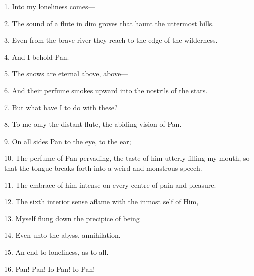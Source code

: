 
1. Into my loneliness comes---

2. The sound of a flute in dim groves that haunt the uttermost hills.

3. Even from the brave river they reach to the edge of the wilderness.

4. And I behold Pan.

5. The snows are eternal above, above---

6. And their perfume smokes upward into the nostrils of the stars.

7. But what have I to do with these?

8. To me only the distant flute, the abiding vision of Pan.

9. On all sides Pan to the eye, to the ear;

10. The perfume of Pan pervading, the taste of him utterly filling my mouth, so that the tongue breaks forth into a weird and monstrous speech.

11. The embrace of him intense on every centre of pain and pleasure.

12. The sixth interior sense aflame with the inmost self of Him,

13. Myself flung down the precipice of being

14. Even unto the abyss, annihilation.

15. An end to loneliness, as to all.

16. Pan! Pan! Io Pan! Io Pan!
